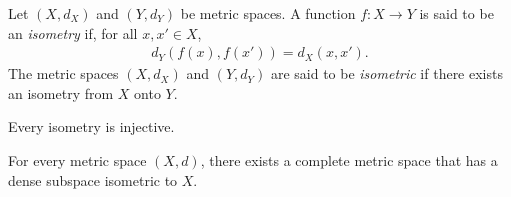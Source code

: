 \documentclass{article}
\begin{document}
\begin{definition}
    Let $(X,d_X)$ and $(Y,d_Y)$ be metric spaces. A function $f:X\to Y$ is said to be 
    an \emph{isometry} if, for all $x,x'\in X$,
    \begin{align*}
        d_Y(f(x),f(x')) = d_X(x,x').
    \end{align*}
    The metric spaces $(X,d_X)$ and $(Y,d_Y)$ are said to be \emph{isometric} 
    if there exists an isometry from $X$ onto $Y$.
\end{definition}

\begin{corollary}
    Every isometry is injective.
\end{corollary}

\begin{proposition}[Notes 7.16]
    For every metric space $(X,d)$, there exists a complete metric space that has a dense subspace 
    isometric to $X$.
\end{proposition}
\end{document}
